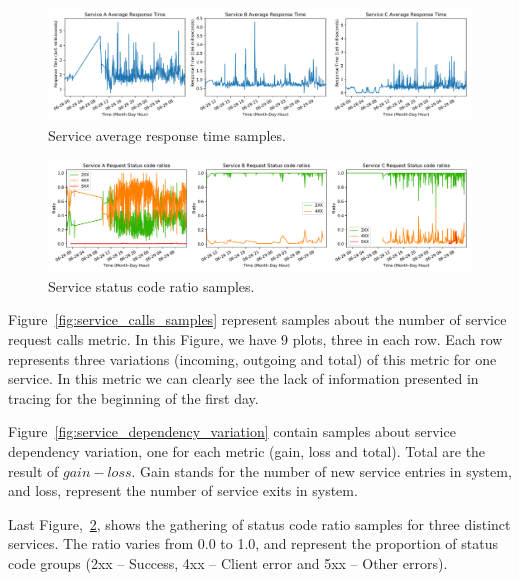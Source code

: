 \begin{figure}[H]
    \centering
    \includegraphics[width=1.00\textwidth]{images/service_avg_response_time.pdf}
    \caption{Service average response time samples.}
    \label{fig:service_avg_response_time_samples}
\end{figure}


\begin{figure}[H]
    \centering
    \includegraphics[width=1.00\textwidth]{images/service_status_code_ratio.pdf}
    \caption{Service status code ratio samples.}
    \label{fig:service_status_code_ratio_samples}
\end{figure}

Figure~\ref{fig:service_calls_samples} represent samples about the number of service request calls metric. In this Figure, we have 9 plots, three in each row. Each row represents three variations (incoming, outgoing and total) of this metric for one service. In this metric we can clearly see the lack of information presented in tracing for the beginning of the first day.

Figure~\ref{fig:service_dependency_variation} contain samples about service dependency variation, one for each metric (gain, loss and total). Total are the result of $gain - loss$. Gain stands for the number of new service entries in system, and loss, represent the number of service exits in system.

Last Figure,~\ref{fig:service_status_code_ratio_samples}, shows the gathering of status code ratio samples for three distinct services. The ratio varies from 0.0 to 1.0, and represent the proportion of status code groups (2xx -- Success, 4xx -- Client error and 5xx -- Other errors).


